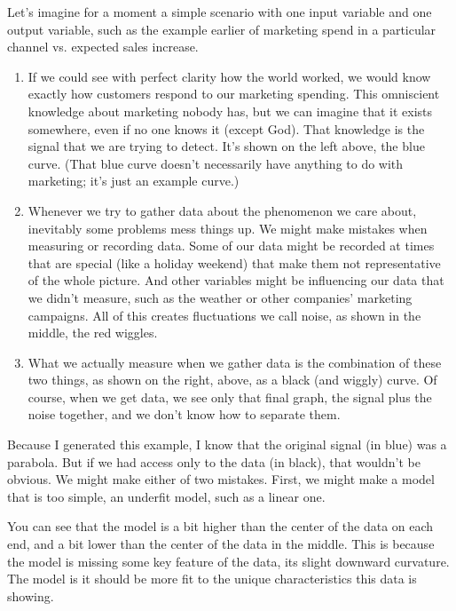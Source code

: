 \documentclass[letterpaper,10pt,english]{jupyterBook}
\begin{document}
\sphinxAtStartPar
Let’s imagine for a moment a simple scenario with one input variable and one output variable, such as the example earlier of marketing spend in a particular channel vs. expected sales increase.
\begin{enumerate}
%
\item {} 
\sphinxAtStartPar
If we could see with perfect clarity how the world worked, we would know exactly how customers respond to our marketing spending.  This omniscient knowledge about marketing nobody has, but we can imagine that it exists somewhere, even if no one knows it (except God).  That knowledge is the signal that we are trying to detect.  It’s shown on the left above, the blue curve.  (That blue curve doesn’t necessarily have anything to do with marketing; it’s just an example curve.)

\item {} 
\sphinxAtStartPar
Whenever we try to gather data about the phenomenon we care about, inevitably some problems mess things up.  We might make mistakes when measuring or recording data.  Some of our data might be recorded at times that are special (like a holiday weekend) that make them not representative of the whole picture.  And other variables might be influencing our data that we didn’t measure, such as the weather or other companies’ marketing campaigns.  All of this creates fluctuations we call noise, as shown in the middle, the red wiggles.

\item {} 
\sphinxAtStartPar
What we actually measure when we gather data is the combination of these two things, as shown on the right, above, as a black (and wiggly) curve.  Of course, when we get data, we see only that final graph, the signal plus the noise together, and we don’t know how to separate them.

\end{enumerate}

\sphinxAtStartPar
Because I generated this example, I know that the original signal (in blue) was a parabola.  But if we had access only to the data (in black), that wouldn’t be obvious.  We might make either of two mistakes.  First, we might make a model that is too simple, an underfit model, such as a linear one.

\sphinxAtStartPar
{}

\sphinxAtStartPar
You can see that the model is a bit higher than the center of the data on each end, and a bit lower than the center of the data in the middle.  This is because the model is missing some key feature of the data, its slight downward curvature.  The model is  it should be more fit to the unique characteristics this data is showing.
\end{document}
